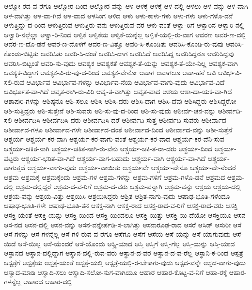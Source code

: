 {ಆಲ್ಮೋ-ರದ-ವ-ರೆಗೂ
ಆಲ್ಮೋರ-ದಿಂದ
ಆಲ್ಮೋರ-ವನ್ನು
ಆಳ-ಆಳಕ್ಕೆ
ಆಳಕ್ಕೆ
ಆಳ-ದಲ್ಲಿ
ಆಳಲು
ಆಳ-ವನ್ನು
ಆಳ-ವಾಗಿ
ಆಳ-ವಾಗಿತ್ತು
ಆಳ-ವಾ-ಗಿದೆ
ಆಳ-ವಾದ
ಆಳಸಿಂಗ
ಆಳಿದ
ಆಳು
ಆಳು-ಕಾಳು-ಗಳು
ಆಳು-ಗಳು
ಆಳು-ಗಳೊ-ಡನೆ
ಆಳುತ್ತಿದ್ದು-ದ-ರಿಂದ
ಆಳುತ್ತಿರುವ
ಆಳುತ್ತಿರು-ವನು
ಆಳುತ್ತಿರುವ-ವರ
ಆಳು-ವಂತೆ
ಆಳ್ವಾ-ರಿಗೆ
ಆಳ್ವಾರಿನ
ಆಳ್ವಾರಿ-ನಲ್ಲಿ
ಆಳ್ವಾರಿ-ನಲ್ಲೆಲ್ಲಾ
ಆಳ್ವಾ-ರಿ-ನಿಂದ
ಆಳ್ವಿಕೆ
ಆಳ್ವಿಕೆಯ
ಆಳ್ವಿಕೆ-ಯನ್ನೆಲ್ಲ
ಆಳ್ವಿಕೆ-ಯಲ್ಲಿ-ರು-ವಾಗ
ಆವರಣ
ಆವರ-ಣ-ದಲ್ಲಿ
ಆವರ-ಣ-ದೊ-ಡನೆ
ಆವರ-ಣ-ದೊಳಗೆ
ಆವರ-ಣ-ವಿತ್ತೊ
ಆವರಿ-ಸಿ-ಕೊಂಡಿತು
ಆವರಿಸಿ-ಕೊಂಡಿ-ರು-ವುವು
ಆವರಿಸಿ-ಕೊಂಡು-ಬಿಟ್ಟಿತು
ಆವರಿಸಿತು
ಆವರಿ-ಸಿ-ದಂತೆ
ಆವರಿಸಿ-ದಾಗ
ಆವರಿಸಿದೆ
ಆವರಿಸಿದ್ದ
ಆವರಿಸಿದ್ದರೂ
ಆವರಿಸಿದ್ದವು
ಆವರಿಸಿ-ಬಿಟ್ಟಂತೆ
ಆವರಿ-ಸು-ವುದು
ಆವಶ್ಯಕ
ಆವಶ್ಯಕತೆ
ಆವಶ್ಯಕ-ತೆ-ಯನ್ನು
ಆವಶ್ಯಕ-ತೆ-ಯೇ-ನಿಲ್ಲ
ಆವಶ್ಯಕ-ವಾಗಿ
ಆವಶ್ಯಕ-ವಿದ್ದಾಗ
ಆವಶ್ಯಕ-ವಿ-ರು-ವು-ದ-ರಿಂದ
ಆವಶ್ಯಕ-ವೇನೋ
ಆವಾಗ
ಆವಾಗಲೂ
ಆವಾ-ಹನೆ
ಆವಿ
ಆವಿರ್ಭವಿ-ಸಲಿ-ರುವ
ಆವಿರ್ಭಾವ
ಆವಿರ್ಭಾವ-ಗಳನ್ನು
ಆವಿರ್ಭಾವ-ನೆಯ
ಆವಿರ್ಭಾವ-ವಾಗು-ವುದು
ಆವಿರ್ಭಾವ-ವಿದೆ
ಆವಿರ್ಭೂತ-ವಾ-ಗಿದೆ
ಆವೃತ-ರಾಗಿ-ರು-ವಿರಿ
ಆವೃ-ತ-ವಾಗಿತ್ತು
ಆವೃತ-ವಾದ
ಆಶಯ
ಆಶಾ-ದಾ-ಯಕ-ವಾ-ಗಿದೆ
ಆಶಾಪುರಿ-ಗಳನ್ನು
ಆಶಿಷ್ಠನೂ
ಆಶಿ-ಸಲೂ
ಆಶಿಸಿ
ಆಶಿಸಿ-ದರು
ಆಶಿಸಿ-ದಾಗ
ಆಶಿಸಿ-ದೆವು
ಆಶಿಸಿದ್ದರು
ಆಶಿಸಿದ್ದರೋ
ಆಶಿ-ಸುತ್ತಿದ್ದರು
ಆಶಿ-ಸುತ್ತೇನೆ
ಆಶಿ-ಸುವರು
ಆಶಿ-ಸು-ವು-ದ-ರಿಂದ
ಆಶಿ-ಸು-ವುದು
ಆಶೀರ್ವ-ಚನ-ವನ್ನು
ಆಶೀರ್ವದಿ-ಸಲಿ
ಆಶೀರ್ವದಿಸಿ
ಆಶೀರ್ವದಿಸಿ-ದರು
ಆಶೀರ್ವದಿಸಿ-ದರೆ
ಆಶೀರ್ವದಿ-ಸುತ್ತ
ಆಶೀರ್ವದಿ-ಸುವರು
ಆಶೀರ್ವಾದ
ಆಶೀರ್ವಾದ-ಗಳೂ
ಆಶೀರ್ವಾದ-ಗಳೇ
ಆಶೀರ್ವಾದ-ದಂತೆ
ಆಶೀರ್ವಾದ-ದಿಂದ
ಆಶೀರ್ವಾದ-ವನ್ನು
ಆಶೀ-ಸುತ್ತೆನೆ
ಆಶ್ಚರ್ಯ
ಆಶ್ಚರ್ಯ-ಕರ-ವಾಗಿ
ಆಶ್ಚರ್ಯ-ಕರ-ವಾಗು-ವಂತೆ
ಆಶ್ಚರ್ಯ-ಕರ-ವಾದ
ಆಶ್ಚರ್ಯ-ಕರ-ವೆನಿ-ಸುವ
ಆಶ್ಚರ್ಯ-ಚಕಿತ-ನಾಗಿ
ಆಶ್ಚರ್ಯ-ಚಕಿತ-ನಾಗಿ-ರು-ವೆನು
ಆಶ್ಚರ್ಯ-ಚಕಿ-ತ-ರಾ-ದರು
ಆಶ್ಚರ್ಯ-ದಿಂದ
ಆಶ್ಚರ್ಯ-ಪಟ್ಟರು
ಆಶ್ಚರ್ಯ-ಭರಿತ-ವಾ-ಗಿದೆ
ಆಶ್ಚರ್ಯ-ವಾಗ-ಬಹುದು
ಆಶ್ಚರ್ಯ-ವಾಗಿ
ಆಶ್ಚರ್ಯ-ವಾ-ಗಿದೆ
ಆಶ್ಚರ್ಯ-ವಾಗುತ್ತದೆ
ಆಶ್ಚರ್ಯ-ವಾಗು-ವುದು
ಆಶ್ಚರ್ಯ-ವಾಯಿತು
ಆಶ್ಚರ್ಯವೇ
ಆಶ್ಚರ್ಯ-ವೇನೂ
ಆಶ್ಚರ್ಯ-ವೇ-ನೆಂದರೆ
ಆಶ್ರಮ
ಆಶ್ರಮಕ್ಕೆ
ಆಶ್ರಮಕ್ಕೆಂದು
ಆಶ್ರಮ-ಗಳ
ಆಶ್ರಮ-ಗಳನ್ನು
ಆಶ್ರಮ-ಗಳಿಗೆ
ಆಶ್ರಮ-ಗಳೊ-ಡನೆ
ಆಶ್ರಮದ
ಆಶ್ರಮ-ದಲ್ಲಿ
ಆಶ್ರಮ-ದಲ್ಲಿದ್ದರೆ
ಆಶ್ರಮ-ದ-ವ-ರಿಗೆ
ಆಶ್ರಮ-ದ-ವರು
ಆಶ್ರಮ-ವನ್ನಾಗಿ
ಆಶ್ರಮ-ವನ್ನು
ಆಶ್ರಯ
ಆಶ್ರಯ-ದಲ್ಲಿ
ಆಶ್ರಯ-ವನ್ನು
ಆಶ್ರಯ-ವಿತ್ತು
ಆಶ್ರಯಿಸಿ
ಆಶ್ರಯಿಸಿದ್ದರು
ಆಶ್ರಿತ
ಆಶ್ರಿತ-ನಾಗು-ವುದು
ಆಷಾಢ-ಭೂತಿ-ಗಳೆಂದೂ
ಆಷಾಢ-ಭೂತಿ-ಗಳೇ
ಆಷಾಢ-ಭೂತಿ-ತನ
ಆಸಕ್ತ-ನಾಗಿ
ಆಸಕ್ತ-ರಾದ
ಆಸಕ್ತ-ರಾದ-ವ-ರಿಗೆ
ಆಸಕ್ತ-ರಾದ-ವರು
ಆಸಕ್ತಿ
ಆಸಕ್ತಿ-ಯಂತೆ
ಆಸಕ್ತಿ-ಯನ್ನು
ಆಸಕ್ತಿ-ಯಿಂದ
ಆಸಕ್ತಿ-ಯಿಂದಲೂ
ಆಸಕ್ತಿ-ಯಿತ್ತು
ಆಸಕ್ತಿ-ಯಿ-ದೆಯೋ
ಆಸಕ್ತಿಯೂ
ಆಸನ
ಆಸ-ನದ
ಆಸನ-ದಲ್ಲಿ
ಆಸನ-ವನ್ನು
ಆಸನ-ವನ್ನೇರ್ಪಡಿ-ಸ-ಲಾಗಿತ್ತು
ಆಸನಾರೂಢ-ರಾದ
ಆಸರೆ
ಆಸಿಡ್
ಆಸುರೀ
ಆಸೆ
ಆಸೆ-ಗಳನ್ನು
ಆಸೆ-ಗಳನ್ನೆಲ್ಲ
ಆಸೆ-ಗಳಿ-ರುವ-ವ-ರೆಗೂ
ಆಸೆಗೂ
ಆಸೆಗೆ
ಆಸೆಯ
ಆಸೆ-ಯನ್ನು
ಆಸೆ-ಯಾಗುವುದು
ಆಸೆ-ಯಿದೆ
ಆಸೆ-ಯಿಲ್ಲ
ಆಸೆ-ಯೆಂದರೆ
ಆಸೆ-ಯೊಂದು
ಆಸ್ಟ್ರಿ-ಯಾದ
ಆಸ್ತಿ
ಆಸ್ತಿಗೆ
ಆಸ್ತಿ-ಗೆಲ್ಲ
ಆಸ್ತಿ-ಯನ್ನು
ಆಸ್ತಿ-ಯಾದ
ಆಸ್ಥಾನದ
ಆಸ್ಥಾನ-ದಲ್ಲಿದ್ದಾಗ
ಆಸ್ಥಾನ-ದಲ್ಲಿ-ರುವ-ವರು
ಆಸ್ಥಾನ-ದ-ವರ
ಆಸ್ಥಾನ-ದ-ವ-ರೆಲ್ಲ
ಆಸ್ಥಾನಿ-ಕ-ರಿಂದ
ಆಸ್ಪತ್ರೆ
ಆಸ್ಪತ್ರೆಗೆ
ಆಸ್ಪತ್ರೆಯ
ಆಸ್ಪತ್ರೆ-ಯಂತೆ
ಆಸ್ಪತ್ರೆ-ಯಲ್ಲಿ
ಆಸ್ಪತ್ರೆ-ಯಲ್ಲಿ-ರ-ಬೇಕಾಗು-ವುದು
ಆಸ್ಪದ-ವನ್ನೇ
ಆಸ್ಪದ-ವಾಗು-ವುದು
ಆಸ್ವಾದ-ಮಾಡಿ
ಆಸ್ವಾದಿ-ಸಲು
ಆಸ್ವಾದಿ-ಸಲೋ-ಸುಗ-ವಾಗಿಯೂ
ಆಹಾರ
ಆಹಾರ-ಕೊಟ್ಟ-ವ-ನಿಗೆ
ಆಹಾ-ರಕ್ಕೆ
ಆಹಾರ-ಗಳನ್ನೆಲ್ಲ
ಆಹಾರದ
ಆಹಾರ-ದಲ್ಲಿ
}
